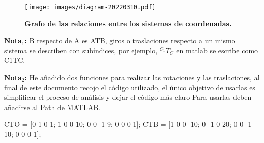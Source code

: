 \documentclass[11pt,a4paper]{article}
\begin{document}
\portada
\newpage

\begin{figure}[H]
    \centering
    \texttt{[image: images/diagram-20220310.pdf]}
    \caption{\textbf{Grafo de las relaciones entre los sistemas de coordenadas.}}
\end{figure}

\textbf{Nota$_1$:} B respecto de A es ATB, giros o traslaciones respecto a un mismo sistema se describen con subíndices, por ejemplo, $^{C_1}T_{C}$ en matlab se escribe como C1TC.

\textbf{Nota$_2$:} He añadido dos funciones para realizar las rotaciones y las traslaciones, al final de este documento recojo el código utilizado, el único objetivo de usarlas es simplificar el proceso de análisis y dejar el código más claro Para usarlas deben añadirse al Path de MATLAB.

\begin{matlabcode}
CTO = [0 1 0 1;  1 0 0 10; 0 0 -1 9; 0 0 0 1]; 
CTB = [1 0 0 -10; 0 -1 0 20; 0 0 -1 10; 0 0 0 1]; 
\end{matlabcode}
\end{document}
